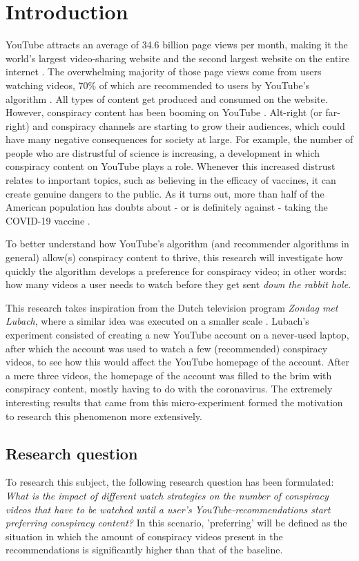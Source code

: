\documentclass[../main.tex]{subfiles}
\begin{document}
\section{Introduction}
YouTube attracts an average of 34.6 billion page views per month, making it the world's largest
video-sharing website and the second largest website on the entire internet \citep{neufeld_2021}. The
overwhelming majority of those page views come from users watching videos, 70\% of which are recommended
to users by YouTube's algorithm \citep{cooper_2020}. All types of content get produced and consumed on
the website. However, conspiracy content has been booming on YouTube \citep{donzelli2018misinformation}.
Alt-right (or far-right) and conspiracy channels are starting to grow their audiences, which could have
many negative consequences for society at large. For example, the number of people who are distrustful
of science is increasing, a development in which conspiracy content on YouTube plays a role. Whenever
this increased distrust relates to important topics, such as believing in the efficacy of vaccines, it
can create genuine dangers to the public. As it turns out, more than half of the American population has
doubts about - or is definitely against - taking the COVID-19 vaccine \citep{rosenbaum2021escaping}. 

To better understand how YouTube's algorithm (and recommender algorithms in general) allow(s) conspiracy
content to thrive, this research will investigate how quickly the algorithm develops a preference for 
conspiracy video; in other words: how many videos a user needs to watch before they get sent 
\textit{down the rabbit hole}. 

This research takes inspiration from the Dutch television program \textit{Zondag met Lubach}, where a
similar idea was executed on a smaller scale \citep{lubach_2020}. Lubach's experiment consisted of 
creating a new YouTube account on a never-used laptop, after which the account was used to watch a few 
(recommended) conspiracy videos, to see how this would affect the YouTube homepage of the account. After
a mere three videos, the homepage of the account was filled to the brim with conspiracy content, mostly 
having to do with the coronavirus. The extremely interesting results that came from this 
micro-experiment formed the motivation to research this phenomenon more extensively. 

\subsection{Research question}
To research this subject, the following research question has been formulated:
\textit{What is the impact of different watch strategies on the number of conspiracy videos that have to
be watched until a user's YouTube-recommendations start preferring conspiracy content?} In this scenario,
'preferring' will be defined as the situation in which the amount of conspiracy videos present in the
recommendations is significantly higher than that of the baseline.
\end{document}
